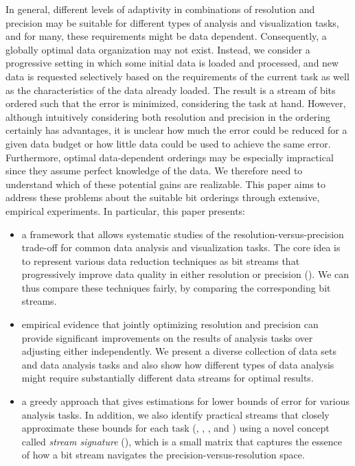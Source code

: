 In general, different levels of adaptivity in combinations of resolution and precision may be
suitable for different types of analysis and visualization tasks, and for many, these requirements
might be data dependent. Consequently, a globally optimal data organization may not exist. Instead,
we consider a progressive setting in which some initial data is loaded and processed, and new data
is requested selectively based on the requirements of the current task as well as the
characteristics of the data already loaded. The result is a stream of bits ordered such that the
error is minimized, considering the task at hand. However, although intuitively considering both
resolution and precision in the ordering certainly has advantages, it is unclear how much the error
could be reduced for a given data budget or how little data could be used to achieve the same error.
Furthermore, optimal data-dependent orderings may be especially impractical since they assume
perfect knowledge of the data. We therefore need to understand which of these potential gains are
realizable. This paper aims to address these problems about the suitable bit orderings through
extensive, empirical experiments. In particular, this paper presents:

\begin{itemize}\dense
%
\item a framework that allows systematic studies of the resolution-versus-precision trade-off for
common data analysis and visualization tasks. The core idea is to represent various data reduction
techniques as bit streams that progressively improve data quality in either resolution or precision
(). We can thus compare these techniques fairly, by comparing the
corresponding bit streams.
%  
\item empirical evidence that jointly optimizing resolution and precision can provide significant
improvements on the results of analysis tasks over adjusting either independently. We present a
diverse collection of data sets and data analysis tasks and also show how different types of data
analysis might require substantially different data streams for optimal results.
%
\item a greedy approach that gives estimations for lower bounds of error for various analysis tasks.
In addition, we also identify practical streams that closely approximate these bounds for each task
(, , , and )
using a novel concept called \emph{stream signature} (), which is a small
matrix that captures the essence of how a bit stream navigates the precision-versus-resolution
space.
\end{itemize}


